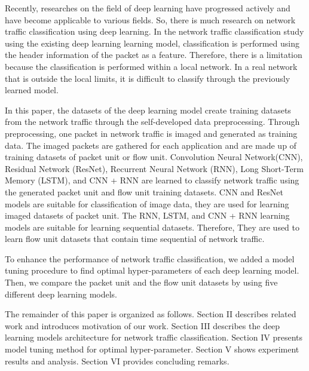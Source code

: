 Recently, researches on the field of deep learning have progressed actively and have become applicable to various fields.
So, there is much research on network traffic classification using deep learning.
In the network traffic classification study using the existing deep learning learning model, classification is performed using the header information of the packet as a feature.
Therefore, there is a limitation because the classification is performed within a local network.
In a real network that is outside the local limits, it is difficult to classify through the previously learned model.

In this paper, the datasets of the deep learning model create training datasets from the network traffic through the self-developed data preprocessing.
Through preprocessing, one packet in network traffic is imaged and generated as training data.
The imaged packets are gathered for each application and are made up of training datasets of packet unit or flow unit.
Convolution Neural Network(CNN), Residual Network (ResNet), Recurrent Neural Network (RNN), Long Short-Term Memory (LSTM), and CNN + RNN are learned to classify network traffic using the generated packet unit and flow unit training datasets.
CNN and ResNet models are suitable for classification of image data, they are used for learning imaged datasets of packet unit.
The RNN, LSTM, and CNN + RNN learning models are suitable for learning sequential datasets.
Therefore, They are used to learn flow unit datasets that contain time sequential of network traffic.

To enhance the performance of network traffic classification, we added a model tuning procedure to find optimal hyper-parameters of each deep learning model.
Then, we compare the packet unit and the flow unit datasets by using five different deep learning models.

The remainder of this paper is organized as follows.
Section II describes related work and introduces motivation of our work.
Section III describes the deep learning models architecture for network traffic classification.
Section IV presents model tuning method for optimal hyper-parameter.
Section V shows experiment results and analysis.
Section VI provides concluding remarks.